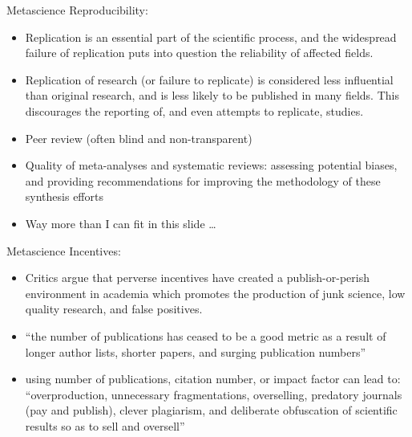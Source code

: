 \documentclass{beamer}
\begin{document}
\begin{frame}{Metascience}
	Reproducibility:
	\begin{itemize}
		\item<2-> Replication is an essential part of the scientific process, and the widespread failure of replication puts into question the reliability of affected fields.
		\item<3-> Replication of research (or failure to replicate) is considered less influential than original research, and is less likely to be published in many fields. This discourages the reporting of, and even attempts to replicate, studies.
	\end{itemize}
	\begin{itemize}
		\item<5-> Peer review (often blind and non-transparent)
		\item<6-> Quality of meta-analyses and systematic reviews: assessing potential biases, and providing recommendations for improving the methodology of these synthesis efforts
		\item<7-> Way more than I can fit in this slide \dots
\end{itemize}
\end{frame}

\begin{frame}{Metascience}
	Incentives:
	\begin{itemize}
		\item Critics argue that perverse incentives have created a publish-or-perish environment in academia which promotes the production of junk science, low quality research, and false positives.
		\item ``the number of publications has ceased to be a good metric as a result of longer author lists, shorter papers, and surging publication numbers''
		\item using number of publications, citation number, or impact factor can lead to: ``overproduction, unnecessary fragmentations, overselling, predatory journals (pay and publish), clever plagiarism, and deliberate obfuscation of scientific results so as to sell and oversell''
	\end{itemize}
\end{frame}
\end{document}

